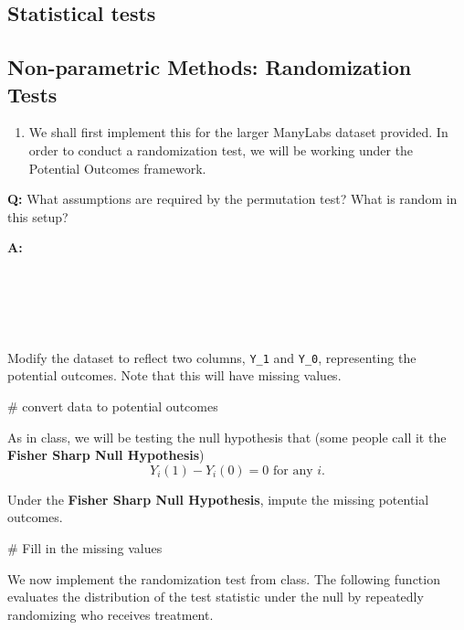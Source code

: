 \documentclass[
  letterpaper,
  DIV=11,
  numbers=noendperiod]{scrartcl}
\newenvironment{Shaded}{\begin{snugshade}}{\end{snugshade}}
\newcommand{\CommentTok}[1]{\textcolor[rgb]{0.37,0.37,0.37}{#1}}
\providecommand{\tightlist}{%
  \setlength{\itemsep}{0pt}\setlength{\parskip}{0pt}}
\begin{document}
\subsection{Statistical tests}\label{statistical-tests}

\subsection{Non-parametric Methods: Randomization
Tests}\label{non-parametric-methods-randomization-tests}

\begin{enumerate}
\def\labelenumi{\arabic{enumi}.}
\setcounter{enumi}{5}
\tightlist
\item
  We shall first implement this for the larger ManyLabs dataset
  provided. In order to conduct a randomization test, we will be working
  under the Potential Outcomes framework.
\end{enumerate}

\textbf{Q:} What assumptions are required by the permutation test? What
is random in this setup?

\textbf{A:}\\
\strut \\
\strut \\
\strut \\

Modify the dataset to reflect two columns, \texttt{Y\_1} and
\texttt{Y\_0}, representing the potential outcomes. Note that this will
have missing values.

\begin{Shaded}
\begin{Highlighting}[]
\CommentTok{\# convert data to potential outcomes}
\end{Highlighting}
\end{Shaded}

As in class, we will be testing the null hypothesis that (some people
call it the \textbf{Fisher Sharp Null Hypothesis})
\[Y_i(1) - Y_i(0) = 0 \text{ for any }i.\]

Under the \textbf{Fisher Sharp Null Hypothesis}, impute the missing
potential outcomes.

\begin{Shaded}
\begin{Highlighting}[]
\CommentTok{\# Fill in the missing values }
\end{Highlighting}
\end{Shaded}

We now implement the randomization test from class. The following
function evaluates the distribution of the test statistic under the null
by repeatedly randomizing who receives treatment.
\end{document}
